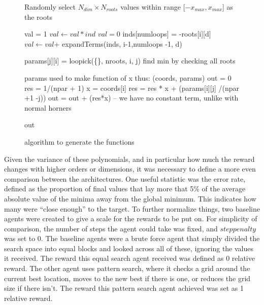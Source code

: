 \begin{figure}
\begin{algorithmic}
\State Randomly select  $N_{dim}\times N_{roots}$ values within range [$-x_{max}, x_{max}$] as the roots

               \State val = 1
                    \State$ val \gets val*ind$
                \EndFor
               \State {}
            \Else
                \State $val = 0$
                    \State inds[numloops] = -roots[i][d]  
                    \State$ val \gets val $+ expandTerms(inds, i-1,numloops -1, d) 
                \EndFor
                \State {}
            \EndIf
      \EndFunction
        
            \State params[j][i] = loopick(\{\}, nroots, i, j)
        \EndFor
    \EndFor
   \State find min by checking all roots
    
  \State params used to make function of x thus:
  \Function (coords, params)
    \State out = 0
         \State res = 1/(npar + 1)   
        \State x = coords[i]
              \State res = res * x + (params[i][j] /(npar +1 -j))
	    \EndFor
	   \State out =  out + (res*x) -- we have no constant term, unlike with normal horners
    \EndFor

    \Return out
\EndFunction
\end{algorithmic}
\caption{algorithm to generate the functions}
\label{alg:functiongen}
\end{figure}

Given the variance of these polynomials, and in particular how much the reward changes with higher orders or dimensions, it was necessary to define a more even comparison between the architectures. One useful statistic was the error rate, defined as the proportion of final values that lay more that 5\% of the average absolute value of the minima away from the global minimum. This indicates how many were ``close enough'' to the target. To further normalize things, two baseline agents were created to give a scale for the rewards to be put on. For simplicity of comparison, the number of steps the agent could take was fixed, and $steppenalty$ was set to 0. The baseline agents were a brute force agent that simply divided the search space into equal blocks and looked across all of these, ignoring the values it received. The reward this equal search agent received was defined as 0 relative reward. The other agent uses pattern search, where it checks a grid around the current best location, moves to the new best if there is one, or reduces the grid size if there isn't. The reward this pattern search agent achieved was set as 1 relative reward.

